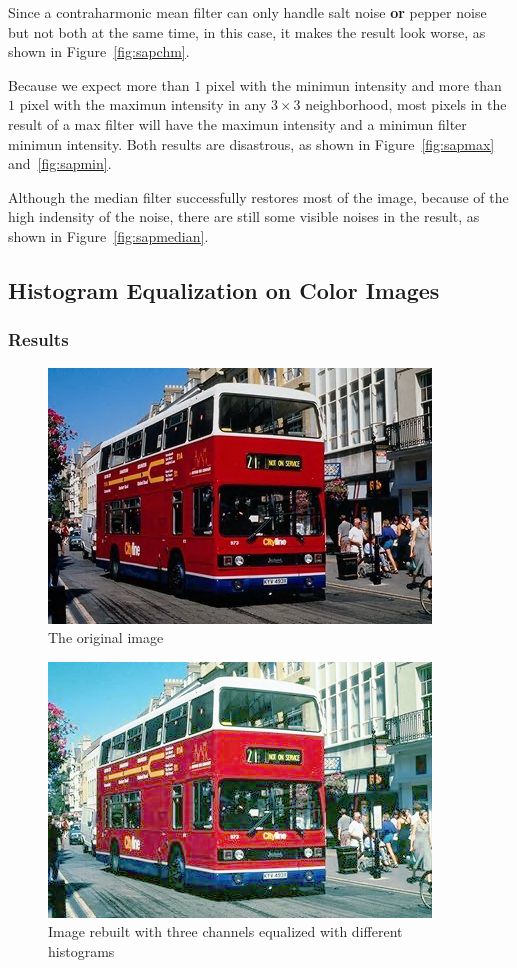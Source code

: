 \documentclass{article}
\begin{document}
Since a contraharmonic mean filter can only handle salt noise \textbf{or} pepper noise but not both at the same time, in this case, it makes the result look worse, as shown in Figure~\ref{fig:sapchm}.

Because we expect more than $1$ pixel with the minimun intensity and more than $1$ pixel with the maximun intensity in any $3 \times 3$ neighborhood, most pixels in the result of a max filter will have the maximun intensity and a minimun filter minimun intensity. Both results are disastrous, as shown in Figure~\ref{fig:sapmax} and~\ref{fig:sapmin}.

Although the median filter successfully restores most of the image, because of the high indensity of the noise, there are still some visible noises in the result, as shown in Figure~\ref{fig:sapmedian}.

\subsection{Histogram Equalization on Color Images}

\subsubsection{Results}

\begin{figure}[H]
	\centering
	\includegraphics[width=288pt]{../img/02.png}
	\caption{The original image}
\end{figure}

\begin{figure}[H]
	\centering
	\includegraphics[width=288pt]{../result/hist/hist-seperate.png}
	\caption{Image rebuilt with three channels equalized with different histograms}
\end{figure}
\end{document}
